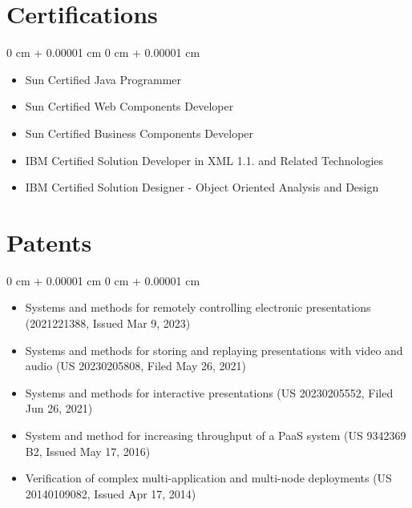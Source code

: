 \documentclass[10pt, letterpaper]{article}
\newenvironment{highlights}{
    \begin{itemize}[
        topsep=0.20 cm,     %
        parsep=0.20 cm,     %
        partopsep=0pt,
        itemsep=0.15cm,     %
        leftmargin=0 cm + 10pt
    ]
}{
    \end{itemize}
} %
\newenvironment{onecolentry}{
    \begin{adjustwidth}{
        0 cm + 0.00001 cm
    }{
        0 cm + 0.00001 cm
    }
}{
    \end{adjustwidth}
} %
\begin{document}
        \vspace{0.4cm} %
        
        \section{Certifications}
        \vspace{0.20 cm} %
        \begin{onecolentry}
            \begin{highlights}
                \item Sun Certified Java Programmer
                \item Sun Certified Web Components Developer
                \item Sun Certified Business Components Developer
                \item IBM Certified Solution Developer in XML 1.1. and Related Technologies
                \item IBM Certified Solution Designer - Object Oriented Analysis and Design
            \end{highlights}
        \end{onecolentry}

        \vspace{0.4cm} %

        \section{Patents}
        \vspace{0.20 cm} %
        \begin{onecolentry}
            \begin{highlights}
                \item Systems and methods for remotely controlling electronic presentations (2021221388, Issued Mar 9, 2023)
                \item Systems and methods for storing and replaying presentations with video and audio (US 20230205808, Filed May 26, 2021)
                \item Systems and methods for interactive presentations (US 20230205552, Filed Jun 26, 2021)
                \item System and method for increasing throughput of a PaaS system (US 9342369 B2, Issued May 17, 2016)
                \item Verification of complex multi-application and multi-node deployments (US 20140109082, Issued Apr 17, 2014)
            \end{highlights}
        \end{onecolentry}
        
\end{document}
